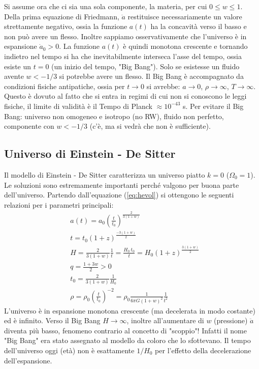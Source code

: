 Si assume ora che ci sia una sola componente, la materia, per cui $0\leq w \leq 1$. Della prima equazione di Friedmann, $\ddot{a}$ restituisce necessariamente un valore strettamente negativo, ossia la funzione $a(t)$ ha la concavità verso il basso e non può avere un flesso. Inoltre sappiamo osservativamente che l'universo è in espansione $\dot{a}_0>0$. La funzione $a(t)$ è quindi monotona crescente e tornando indietro nel tempo si ha che inevitabilmente interseca l'asse del tempo, ossia esiste un $t=0$ (un inizio del tempo, "Big Bang"). Solo se esistesse un fluido avente $w<-1/3$ si potrebbe avere un flesso.  Il Big Bang è accompagnato da condizioni fisiche antipatiche, ossia per $t\rightarrow 0$ si avrebbe: $a\rightarrow 0$, $\rho \rightarrow \infty$, $T \rightarrow \infty$. Questo è dovuto al fatto che si entra in regimi di cui non si conoscono le leggi fisiche, il limite di validità è il Tempo di Planck $\approx 10^{-43}$ s. Per evitare il Big Bang: universo non omogeneo e isotropo (no RW), fluido non perfetto, componente con $w<-1/3$ (c'è, ma si vedrà che non è sufficiente).

\subsection{Universo di Einstein - De Sitter}
Il modello di Einstein - De Sitter caratterizza un universo piatto $k=0$ ($\Omega_0 =1$). Le soluzioni sono estremamente importanti perché valgono per buona parte dell'universo. Partendo dall'equazione (\ref{eq:hevol}) si ottengono le seguenti relazioni per i parametri principali:
\begin{align}
    & a(t) = a_0 \left ( \frac{t}{t_0} \right )^{\frac{2}{3(1+w)}} \\
    & t = t_0 \left ( 1+z \right )^{\frac{-3(1+w)}{2}} \\
    & H = \frac{2}{3(1+w)}\frac{1}{t}=\frac{H_0 ~t_0}{t}=H_0 (1+z)^{\frac{3(1+w)}{2}} \\
    & q = \frac{1+3w}{2} > 0 \\
    & t_0 = \frac{2}{3(1+w)}\frac{1}{H_0} \\
    & \rho  = \rho_0 \left ( \frac{t}{t_0} \right )^{-2}= \rho_0 \frac{1}{6\pi G (1+w)^2}\frac{1}{t^2}
\end{align}
L'universo è in espansione monotona crescente (ma decelerata in modo costante) ed è infinito. Verso il Big Bang $H\rightarrow \infty$, inoltre all'aumentare di $w$ (pressione) $\ddot{a}$ diventa più basso, fenomeno contrario al concetto di "scoppio"! Infatti il nome "Big Bang" era stato assegnato al modello da coloro che lo sfottevano. Il tempo dell'universo oggi (età) non è esattamente $1/H_0$ per l'effetto della decelerazione dell'espansione.


